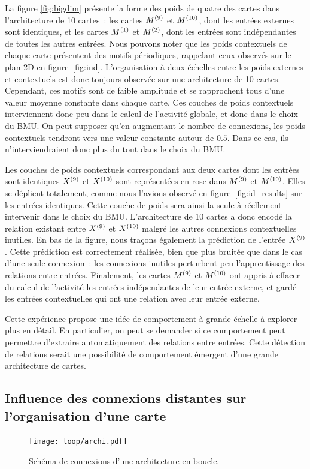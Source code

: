 \documentclass[../main]{subfiles}
\begin{document}
La figure \ref{fig:bigdim} présente la forme des poids de quatre des cartes dans l'architecture de 10 cartes~: les cartes $M^{({9})}$ et $M^{({10})}$, dont les entrées externes sont identiques, et les cartes $M^{({1})}$ et $M^{({2})}$, dont les entrées sont indépendantes de toutes les autres entrées.
Nous pouvons noter que les poids contextuels de chaque carte présentent des motifs périodiques, rappelant ceux observés sur le plan 2D en figure~\ref{fig:ind}. L'organisation à deux échelles entre les poids externes et contextuels est donc toujours observée sur une architecture de 10 cartes.
Cependant, ces motifs sont de faible amplitude et se rapprochent tous d'une valeur moyenne constante dans chaque carte. Ces couches de poids contextuels interviennent donc peu dans le calcul de l'activité globale, et donc dans le choix du BMU. On peut supposer qu'en augmentant le nombre de connexions, les poids contextuels tendront vers une valeur constante autour de $0.5$. Dans ce cas, ils n'interviendraient donc plus du tout dans le choix du BMU.

Les couches de poids contextuels correspondant aux deux cartes dont les entrées sont identiques $X^{({9})}$ et $X^{({10})}$ sont représentées en rose dans $M^{({9})}$ et $M^{({10})}$. 
Elles se déplient totalement, comme nous l'avions observé en figure~\ref{fig:id_results} sur les entrées identiques. Cette couche de poids sera ainsi la seule à réellement intervenir dans le choix du BMU. L'architecture de 10 cartes a donc encodé la relation existant entre $X^{({9})}$ et $X^{({10})}$ malgré les autres connexions contextuelles inutiles.
En bas de la figure, nous traçons également la prédiction de l'entrée $X^{({9})}$.
Cette prédiction est correctement réalisée, bien que plus bruitée que dans le cas d'une seule connexion~: les connexions inutiles perturbent peu l'apprentissage des relations entre entrées. 
Finalement, les cartes $M^{({9})}$ et $M^{({10})}$ ont appris à effacer du calcul de l'activité les entrées indépendantes de leur entrée externe, et gardé les entrées contextuelles qui ont une relation avec leur entrée externe.

Cette expérience propose une idée de comportement à grande échelle à explorer plus en détail.
En particulier, on peut se demander si ce comportement peut permettre d'extraire automatiquement des relations entre entrées. Cette détection de relations serait une possibilité de comportement émergent d'une grande architecture de cartes.

\subsection{Influence des connexions distantes sur l'organisation d'une carte}
\begin{figure}
	\centering\texttt{[image: loop/archi.pdf]}
	\caption{Schéma de connexions d'une architecture en \og boucle\fg{}. \label{fig:archi_loop}}
\end{figure}
\end{document}
